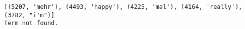 \documentclass[11pt]{article}
\begin{document}
    \begin{Verbatim}[commandchars=\\\{\}]
[(5207, 'mehr'), (4493, 'happy'), (4225, 'mal'), (4164, 'really'), (3782, "i'm")]
Term not found.

    \end{Verbatim}


    
    
    
    
\end{document}

